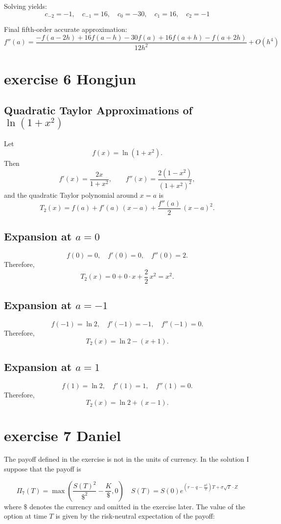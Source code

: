 \documentclass{article}
\begin{document}
Solving yields:
\[
c_{-2} = -1, \quad c_{-1} = 16, \quad c_0 = -30, \quad c_1 = 16, \quad c_2 = -1
\]

Final fifth-order accurate approximation:
\[
f''(a) = \frac{-f(a-2h) + 16f(a-h) - 30f(a) + 16f(a+h) - f(a+2h)}{12h^2} + O(h^4)
\]

\section{exercise 6 Hongjun}
\subsection*{Quadratic Taylor Approximations of \(\ln(1+x^2)\)}

Let
\[
f(x) = \ln(1 + x^2).
\]
Then
\[
f'(x) = \frac{2x}{1 + x^2}, 
\qquad
f''(x) = \frac{2(1 - x^2)}{(1 + x^2)^2},
\]
and the quadratic Taylor polynomial around \(x = a\) is
\[
T_2(x) = f(a) + f'(a)\,(x - a) + \frac{f''(a)}{2}\,(x - a)^2.
\]

\subsection*{Expansion at \(a=0\)}

\[
f(0) = 0, 
\quad
f'(0) = 0,
\quad
f''(0) = 2.
\]
Therefore,
\[
T_2(x) = 0 + 0\cdot x + \frac{2}{2}\,x^2 = x^2.
\]

\subsection*{Expansion at \(a=-1\)}

\[
f(-1) = \ln 2,
\quad
f'(-1) = -1,
\quad
f''(-1) = 0.
\]
Therefore,
\[
T_2(x) = \ln 2 - (x + 1).
\]

\subsection*{Expansion at \(a=1\)}

\[
f(1) = \ln 2,
\quad
f'(1) = 1,
\quad
f''(1) = 0.
\]
Therefore,
\[
T_2(x) = \ln 2 + (x - 1).
\]


\section{exercise 7 Daniel}
The payoff defined in the exercise is not in the units of currency. In the solution I suppose that the payoff is

\[{{\Pi }_{7}}\left( T \right)=\max \left( \frac{S{{\left( T \right)}^{2}}}{{{\$}^{2}}}-\frac{K}{\$},0 \right)\quad S\left( T \right)=S\left( 0 \right){{e}^{\left( r-q-\frac{{{\sigma }^{2}}}{2} \right)T+\sigma \sqrt{T}\cdot Z}}\]
where $\$$ denotes the currency and omitted in the exercise later. The value of the option at time $T$ is given by the risk-neutral expectation of the payoff:
\end{document}
